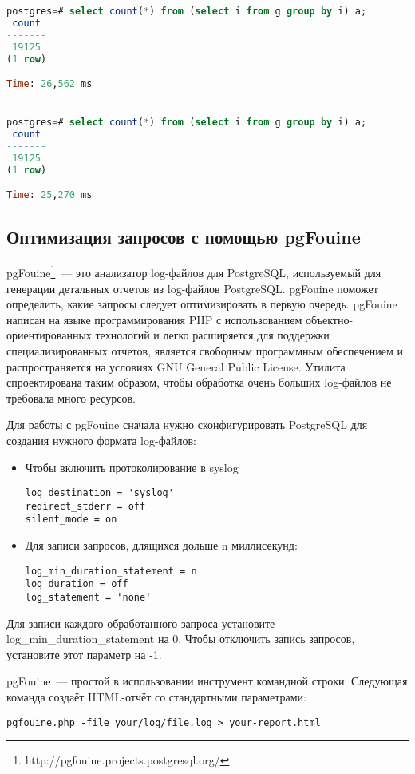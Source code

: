 \begin{lstlisting}[language=SQL,label=lst:sql_performance4,caption=GROUP BY]
postgres=# select count(*) from (select i from g group by i) a;
 count 
-------
 19125
(1 row)

Time: 26,562 ms


postgres=# select count(*) from (select i from g group by i) a;
 count 
-------
 19125
(1 row)

Time: 25,270 ms

\end{lstlisting}

\subsection{Оптимизация запросов с помощью pgFouine}
pgFouine\footnote{http://pgfouine.projects.postgresql.org/}~--- это 
анализатор log-файлов для PostgreSQL, используемый для генерации детальных отчетов из 
log-файлов PostgreSQL. pgFouine поможет определить, какие запросы следует оптимизировать в первую очередь.
pgFouine написан на языке программирования PHP с использованием объектно-ориентированных технологий и легко 
расширяется для поддержки специализированных отчетов, является свободным программным обеспечением и 
распространяется на условиях GNU General Public License. Утилита спроектирована таким образом, чтобы обработка 
очень больших log-файлов не требовала много ресурсов.

Для работы с pgFouine сначала нужно сконфигурировать PostgreSQL для создания нужного формата log-файлов:
\begin{itemize}
\item Чтобы включить протоколирование в syslog
\begin{lstlisting}[label=lst:sql_performance5,caption=pgFouine]
log_destination = 'syslog'
redirect_stderr = off
silent_mode = on
\end{lstlisting}
\item Для записи запросов, длящихся дольше n миллисекунд:
\begin{lstlisting}[label=lst:sql_performance6,caption=pgFouine]
log_min_duration_statement = n
log_duration = off
log_statement = 'none'
\end{lstlisting}
\end{itemize}

Для записи каждого обработанного запроса установите log\_min\_duration\_statement на 0. 
Чтобы отключить запись запросов, установите этот параметр на -1.

pgFouine~--- простой в использовании инструмент командной строки. Следующая команда создаёт 
HTML-отчёт со стандартными параметрами:
\begin{lstlisting}[label=lst:sql_performance7,caption=pgFouine]
pgfouine.php -file your/log/file.log > your-report.html
\end{lstlisting}

